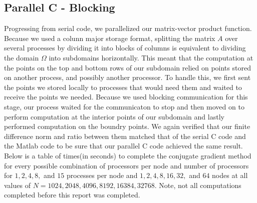 \documentclass[11pt]{article}
\begin{document}
\subsection{Parallel C - Blocking}
Progressing from serial code, we parallelized our matrix-vector product function. Because we used a colunn major storage format, splitting the matrix $A$ over several processes by dividing it into blocks of columns is equivalent to dividing the domain $\Omega$ into subdomains horizontally. This meant that the computation at the points on the top and bottom rows of our subdomain relied on points stored on another process, and possibly another processor. To handle this, we first sent the points we stored locally to processes that would need them and waited to receive the points we needed. Because we used blocking communication for this stage, our process waited for the communicaton to stop and then moved on to perform computation at the interior points of our subdomain and lastly performed computation on the boundry points. We again verified that our finite difference norm and ratio between them matched that of the serial C code and the Matlab code to be sure that our parallel C code achieved the same result.
Below is a table of times(in seconds) to complete the conjugate gradient method for every possible combination of processors per node and number of processors for $1,2,4,8,$ and $15$ processes per node and $1,2,4,8,16,32,$ and $64$ nodes at all values of $N=1024, 2048, 4096, 8192, 16384, 32768$. Note, not all computations completed before this report was completed.
\end{document}
